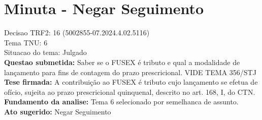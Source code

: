 \documentclass{article}
\begin{document}
\section*{Minuta - Negar Seguimento}
Decisao TRF2: 16 (5002855-07.2024.4.02.5116)\\
Tema TNU: 6\\
Situacao do tema: Julgado\\
\textbf{Questao submetida:} Saber se o FUSEX é tributo e qual a modalidade de lançamento para fins de contagem do prazo prescricional. VIDE TEMA 356/STJ\\
\textbf{Tese firmada:} A contribuição ao FUSEX é tributo cujo lançamento se efetua de ofício, sujeita ao prazo prescricional quinquenal, descrito no art. 168, I, do CTN.\\
\textbf{Fundamento da analise:} Tema 6 selecionado por semelhanca de assunto.\\
\textbf{Ato sugerido:} Negar Seguimento
\end{document}
